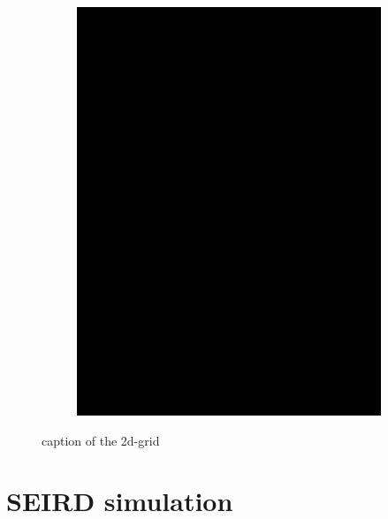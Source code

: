 \begin{figure}
\begin{center}
\begin{subfigure}[b]{0.3\textwidth}
			\includegraphics[width=\textwidth]{./figures/2d_grid_test.png}
		\end{subfigure}
	\end{center}
	\caption{caption of the 2d-grid}
	\label{fig:2d-grid}
\end{figure}



\section{SEIRD simulation}


